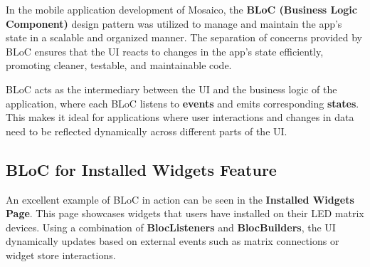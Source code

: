 In the mobile application development of Mosaico, the \textbf{BLoC (Business Logic Component)} design pattern was utilized to manage and maintain the app's state in a scalable and organized manner. The separation of concerns provided by BLoC ensures that the UI reacts to changes in the app's state efficiently, promoting cleaner, testable, and maintainable code.

BLoC acts as the intermediary between the UI and the business logic of the application, where each BLoC listens to \textbf{events} and emits corresponding \textbf{states}. This makes it ideal for applications where user interactions and changes in data need to be reflected dynamically across different parts of the UI.

\subsection{BLoC for Installed Widgets Feature}

An excellent example of BLoC in action can be seen in the \textbf{Installed Widgets Page}. This page showcases widgets that users have installed on their LED matrix devices. Using a combination of \textbf{BlocListeners} and \textbf{BlocBuilders}, the UI dynamically updates based on external events such as matrix connections or widget store interactions.

